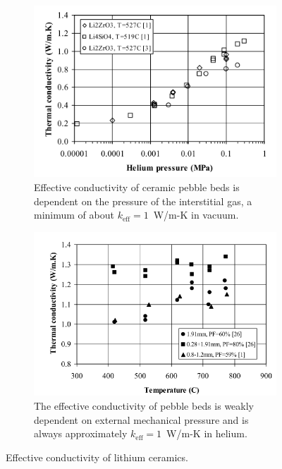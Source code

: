 \begin{figure}
        \centering
        \begin{subfigure}[b]{\doubleimagewidth}
                \includegraphics[width=\textwidth]{chapters/figures/keff-pressure}
                \caption{Effective conductivity of ceramic pebble beds is dependent on the pressure of the interstitial gas, a minimum of about $k_\text{eff} = 1$~W/m-K in vacuum.}
                \label{fig:keff-pressure}
        \end{subfigure}%
        
        \begin{subfigure}[b]{\doubleimagewidth 	}
                \includegraphics[width=\textwidth]{chapters/figures/lit-keff-exp}
                \caption{The effective conductivity of pebble beds is weakly dependent on external mechanical pressure and is always approximately $k_\text{eff} = 1$~W/m-K in helium.}
                \label{fig:keff-lit}
        \end{subfigure}
        \caption{Effective conductivity of lithium ceramics.}\label{fig:keff}
\end{figure}

